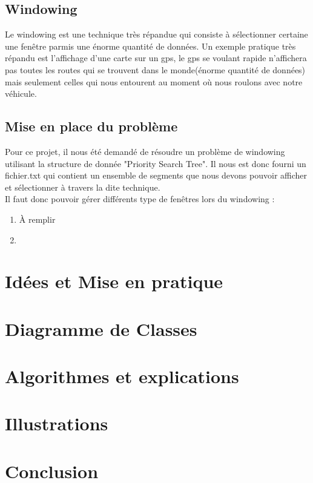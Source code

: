 \documentclass[10pt,a4paper]{article}
\begin{document}
\subsection{Windowing}
Le windowing est une technique très répandue qui consiste à sélectionner certaine une fenêtre parmis une énorme quantité de données. Un exemple pratique très répandu est l'affichage d'une carte sur un gps, le gps se voulant rapide n'affichera pas toutes les routes qui se trouvent dans le monde(énorme quantité de données) mais seulement celles qui nous entourent au moment où  nous roulons avec notre véhicule. 

\subsection{Mise en place du problème}
Pour ce projet, il nous été demandé de résoudre un problème de windowing utilisant la structure de donnée "Priority Search Tree". Il nous est donc fourni un fichier.txt qui contient un ensemble de segments que nous devons pouvoir afficher et sélectionner à travers la dite technique. \\
Il faut donc pouvoir gérer différents type de fenêtres lors du windowing :
\begin{enumerate}
	\item \begin{Huge}
	À remplir
	\end{Huge}
	\item 
	
\end{enumerate}

\section{Idées et Mise en pratique}
\section{Diagramme de Classes}
\section{Algorithmes et explications}

\section{Illustrations}

\section{Conclusion}
\end{document}

